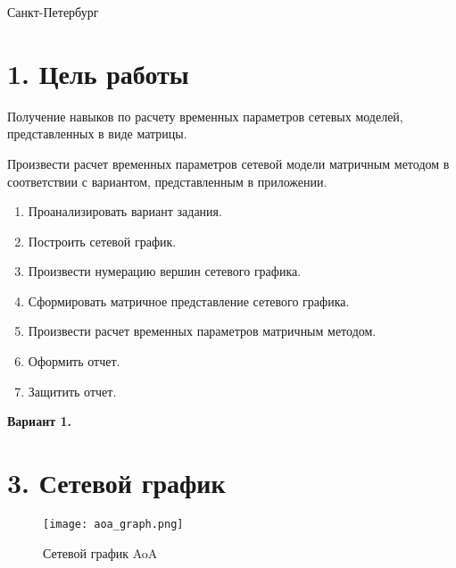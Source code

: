 \documentclass[12pt]{article}
\begin{document}
\begin{titlepage}
\begin{table}[H]
\begin{tabular}{p{1.3in}p{1.0in}p{-0.04in}p{1.63in}p{-0.04in}p{1.63in}}
\end{tabular}
 \end{table}




\vspace{\baselineskip}
\vspace{\baselineskip}
\vspace{\baselineskip}
\vspace{\baselineskip}
\vspace{\baselineskip}
\begin{Center}
Санкт-Петербург \the\year{}
\end{Center}\par
\end{titlepage}

\section*{1. Цель работы}
Получение навыков по расчету временных параметров сетевых моделей, представленных в виде матрицы.


Произвести расчет временных параметров сетевой модели матричным методом в соответствии с вариантом, представленным в приложении.

\begin{enumerate}
    \item Проанализировать вариант задания.
    \item Построить сетевой график.
    \item Произвести нумерацию вершин сетевого графика.
    \item Сформировать матричное представление сетевого графика.
    \item Произвести расчет временных параметров матричным методом.
    \item Оформить отчет.
    \item Защитить отчет.
\end{enumerate}

\textbf{Вариант 1.}

\section*{3. Сетевой график}
\begin{figure}[H]
    \centering
    \texttt{[image: aoa\_graph.png]}
    \caption{Сетевой график AoA}
\end{figure}
\end{document}
